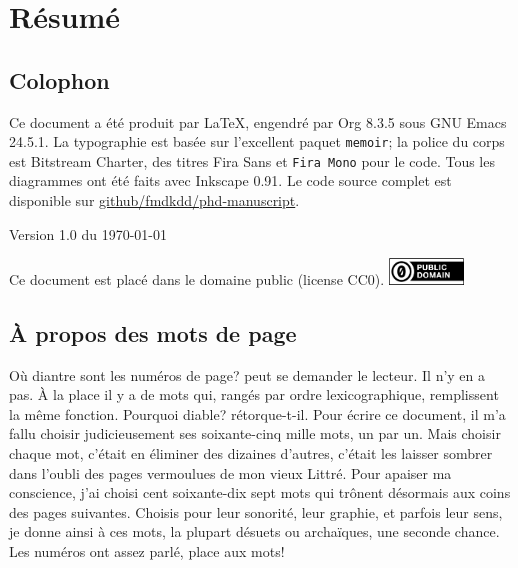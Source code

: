 \cleartorecto
\section*{Résumé}


\cleartorecto
\phantom{a}                     %
\vspace{13cm}
\subsection*{Colophon}
Ce document a été produit par \LaTeX{}, engendré par Org 8.3.5 sous GNU Emacs
24.5.1.  La typographie est basée sur l'excellent paquet \texttt{memoir}; la
police du corps est Bitstream Charter, des titres \textsf{Fira Sans}
et \texttt{Fira Mono} pour le code.  Tous les diagrammes ont été faits avec
Inkscape 0.91.  Le code source complet est disponible sur
\href{https://github.com/fmdkdd/phd-manuscript}{github/fmdkdd/phd-manuscript}.

\vfill
\begin{center}
Version 1.0 du \today
\end{center}

\vfill
\begin{center}
Ce document est placé dans le domaine public (license CC0).
\includegraphics[width=2cm]{img/cc-zero.png}
\end{center}

\cleartoverso
{}
\tableofcontents*

\vfill

\begin{minipage}{0.8\textwidth}
\subsection*{À propos des mots de page}
\og Où diantre sont les numéros de page?\fg{} peut se demander le lecteur.  Il n'y en
a pas.  À la place il y a de mots qui, rangés par ordre lexicographique,
remplissent la même fonction.  \og Pourquoi diable?\fg{} rétorque-t-il.  Pour
écrire ce document, il m'a fallu choisir judicieusement ses soixante-cinq mille
mots, un par un.  Mais choisir chaque mot, c'était en éliminer des dizaines
d'autres, c'était les laisser sombrer dans l'oubli des pages vermoulues de mon
vieux Littré.  Pour apaiser ma conscience, j'ai choisi cent soixante-dix sept
mots qui trônent désormais aux coins des pages suivantes.  Choisis pour leur
sonorité, leur graphie, et parfois leur sens, je donne ainsi à ces mots, la
plupart désuets ou archaïques, une seconde chance.  Les numéros ont assez parlé,
place aux mots!
\end{minipage}

